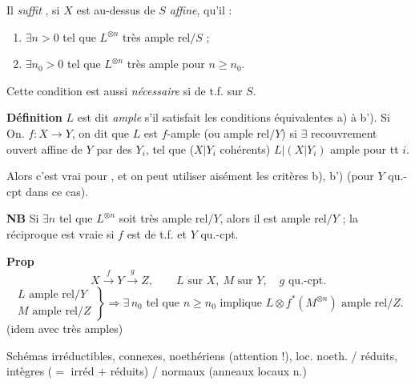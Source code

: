\documentclass[11pt,a4paper]{article}
\begin{document}
 Il \emph{suffit} , si $X$ est au-dessus de $S$ \emph{affine}, qu'il \struck{\ill{}} :

\begin{enumerate}
  \item[c)] $\exists n > 0$ tel que $L^{\otimes n}$ très ample rel$/S$ ;
  \item[c')] $\exists n_0 > 0$ tel que $L^{\otimes n}$ très ample pour $n \geqslant n_0$.
\end{enumerate}

Cette condition est aussi \emph{nécessaire} si  de t.f. sur $S$.

\textbf{Définition} $L$ est dit \emph{ample} s'il satisfait les conditions équivalentes a) à b'). Si  On\ill{}. $f : X \to Y$,   on dit que $L$ est $f$-ample (ou ample rel$/Y$)  si $\exists$ recouvrement ouvert affine de $Y$ par des $Y_i$, tel que ($X|Y_i$ cohérents) $L|(X|Y_i)$ ample pour tt $i$.

 Alors c'est vrai pour , et on peut utiliser aisément les \struck{\ill{}} critères b), b') (pour $Y$ qu.-cpt dans ce cas).

\textbf{NB}  Si $\exists n$ tel que $L^{\otimes n}$ soit très ample rel$/Y$, alors il est ample rel$/Y$ ; la réciproque est vraie si $f$ est de t.f. et $Y$ qu.-cpt.

\textbf{Prop} 
\[
X \xrightarrow{\ f\ } Y \xrightarrow{\ g\ } Z, \qquad L \text{ sur } X,\ M \text{ sur } Y, \quad g \text{ qu.-cpt.}
\]
\[
\left.\begin{array}{l} L \text{ ample rel}/Y \\ M \text{ ample rel}/Z \end{array}\right\}
\Longrightarrow \exists\, n_0 \text{ tel que } n \geqslant n_0 \text{ implique } L \otimes f^{*}(M^{\otimes n}) \text{ ample rel}/Z .
\]
(idem avec très amples)


Schémas irréductibles, connexes, noethériens (attention !), loc. noeth. / réduits, intègres ($=$ irréd $+$ réduits) / normaux  (anneaux locaux n.) 
\end{document}

